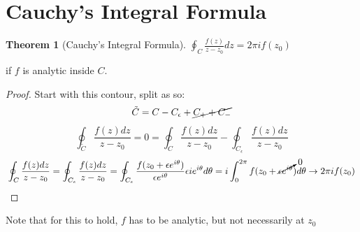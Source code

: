 \documentclass[11pt,notitlepage]{article}
\newtheorem{thm}{Theorem}[section]
\begin{document}
\section{Cauchy's Integral Formula}
\begin{thm}[Cauchy's Integral Formula]
$\oint_C \frac{f(z)}{z-z_0} dz = 2\pi i f(z_0)$ 
\end{thm}
\begin{flushright}
if $f$ is analytic inside $C$.
\end{flushright}
\begin{proof}

Start with this contour, split as so:
$$\tilde C = C - C_\epsilon +\cancel{C_{+} + C_{-}}$$
$$\oint_{\tilde C} \frac{f(z) dz}{z-z_0} 
= 0 
=\oint_{ C} \frac{f(z) dz}{z-z_0} -\oint_{C_\epsilon} \frac{f(z) dz}{z-z_0}$$
$$\oint_{C} \frac{f(z) dz}{z-z_0} 
= \oint_{C_\epsilon} \frac{f(z) dz}{z-z_0}
= \oint_{C_\epsilon} \frac{f(z_0 + \epsilon e^{i\theta}) }{\epsilon e^{i\theta}} \epsilon i e^{i\theta} d\theta 
= i \int_0^{2\pi} f(z_0 + \cancelto{0}{\epsilon e^{i\theta}}) d\theta \rightarrow 2\pi i f(z_0) $$
\end{proof}
Note that for this to hold, $f$ has to be analytic, but not necessarily at $z_0$
\end{document}
